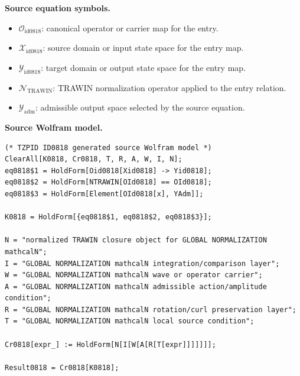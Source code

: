 \begin{minipage}[t]{0.49\linewidth}
\begingroup
\small
\raggedright
\textbf{Source equation symbols.}\par
\begin{itemize}[leftmargin=1.35em,itemsep=1pt,topsep=1pt,parsep=0pt]
    \item $\mathcal{O}_{\mathrm{id0818}}$: canonical operator or carrier map for the entry.
    \item $\mathcal{X}_{\mathrm{id0818}}$: source domain or input state space for the entry map.
    \item $\mathcal{Y}_{\mathrm{id0818}}$: target domain or output state space for the entry map.
    \item $\mathcal{N}_{\mathrm{TRAWIN}}$: TRAWIN normalization operator applied to the entry relation.
    \item $\mathcal{Y}_{\mathrm{adm}}$: admissible output space selected by the source equation.
\end{itemize}
\endgroup
\end{minipage}\hfill
\begin{minipage}[t]{0.47\linewidth}
\begingroup
\scriptsize
\raggedright
\textbf{Source Wolfram model.}\par
\begin{Verbatim}[fontsize=\tiny,breaklines=true,breakanywhere=true]
(* TZPID ID0818 generated source Wolfram model *)
ClearAll[K0818, Cr0818, T, R, A, W, I, N];
eq0818$1 = HoldForm[Oid0818[Xid0818] -> Yid0818];
eq0818$2 = HoldForm[NTRAWIN[OId0818] == OId0818];
eq0818$3 = HoldForm[Element[OId0818[x], YAdm]];

K0818 = HoldForm[{eq0818$1, eq0818$2, eq0818$3}];

N = "normalized TRAWIN closure object for GLOBAL NORMALIZATION mathcalN";
I = "GLOBAL NORMALIZATION mathcalN integration/comparison layer";
W = "GLOBAL NORMALIZATION mathcalN wave or operator carrier";
A = "GLOBAL NORMALIZATION mathcalN admissible action/amplitude condition";
R = "GLOBAL NORMALIZATION mathcalN rotation/curl preservation layer";
T = "GLOBAL NORMALIZATION mathcalN local source condition";

Cr0818[expr_] := HoldForm[N[I[W[A[R[T[expr]]]]]]];

Result0818 = Cr0818[K0818];
\end{Verbatim}
\endgroup
\end{minipage}

